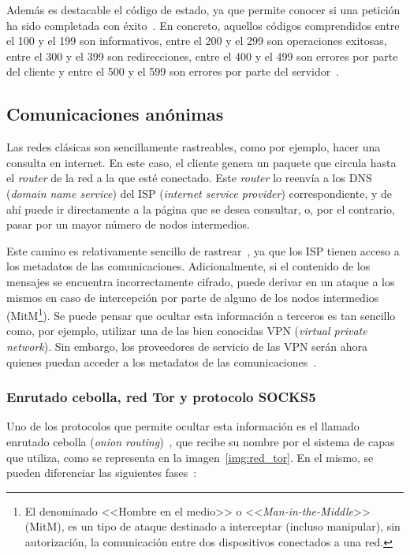 Además es destacable el código de estado, ya que permite conocer si una petición ha sido completada con éxito~\cite{RFCstatuscode}. En concreto, aquellos códigos comprendidos entre el 100 y el 199 son informativos, entre el 200 y el 299 son operaciones exitosas, entre el 300 y el 399 son redirecciones, entre el 400 y el 499 son errores por parte del cliente y entre el 500 y el 599 son errores por parte del servidor~\cite{httpStatus}.


\subsection{Comunicaciones anónimas}

Las redes clásicas son sencillamente rastreables, como por ejemplo, hacer una consulta en internet. En este caso, el cliente genera un paquete que circula hasta el \textit{router} de la red a la que esté conectado. Este \textit{router} lo reenvía a los DNS (\textit{domain name service}) del ISP (\textit{internet service provider}) correspondiente, y de ahí puede ir directamente a la página que se desea consultar, o, por el contrario, pasar por un mayor número de nodos intermedios.

Este camino es relativamente sencillo de rastrear~\cite{TorAndrea2022}, ya que los ISP tienen acceso a los metadatos de las comunicaciones. Adicionalmente, si el contenido de los mensajes se encuentra incorrectamente cifrado, puede derivar en un ataque a los mismos en caso de intercepción por parte de alguno de los nodos intermedios (MitM\footnote{El denominado <<Hombre en el medio>> o <<\textit{Man-in-the-Middle}>> (MitM), es un tipo de ataque destinado a interceptar (incluso manipular), sin autorización, la comunicación entre dos dispositivos conectados a una red.}). Se puede pensar que ocultar esta información a terceros es tan sencillo como, por ejemplo, utilizar una de las bien conocidas VPN (\textit{virtual private network}). Sin embargo, los proveedores de servicio de las VPN serán ahora quienes puedan acceder a los metadatos de las comunicaciones~\cite{TorKeepCoding2022}.


\subsubsection{Enrutado cebolla, red Tor y protocolo SOCKS5}

Uno de los protocolos que permite ocultar esta información es el llamado enrutado cebolla (\textit{onion routing})~\cite{TorAvast2022}, que recibe su nombre por el sistema de capas que utiliza, como se representa en la imagen~\ref{img:red_tor}. En el mismo, se pueden diferenciar las siguientes fases~\cite{TorKeepCoding2022}: 

